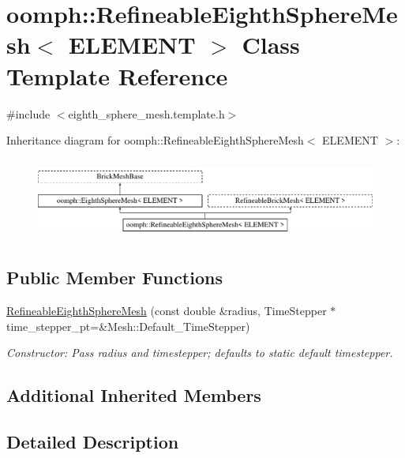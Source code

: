 \hypertarget{classoomph_1_1RefineableEighthSphereMesh}{}\section{oomph\+:\+:Refineable\+Eighth\+Sphere\+Mesh$<$ E\+L\+E\+M\+E\+NT $>$ Class Template Reference}
\label{classoomph_1_1RefineableEighthSphereMesh}


{\ttfamily \#include $<$eighth\+\_\+sphere\+\_\+mesh.\+template.\+h$>$}

Inheritance diagram for oomph\+:\+:Refineable\+Eighth\+Sphere\+Mesh$<$ E\+L\+E\+M\+E\+NT $>$\+:\begin{figure}[H]
\begin{center}
\leavevmode
\includegraphics[height=2.692308cm]{classoomph_1_1RefineableEighthSphereMesh}
\end{center}
\end{figure}
\subsection*{Public Member Functions}
\begin{DoxyCompactItemize}
\item 
\hyperlink{classoomph_1_1RefineableEighthSphereMesh_a975d12a45de7356f50bd69f3197659aa}{Refineable\+Eighth\+Sphere\+Mesh} (const double \&radius, Time\+Stepper $\ast$time\+\_\+stepper\+\_\+pt=\&Mesh\+::\+Default\+\_\+\+Time\+Stepper)
\begin{DoxyCompactList}\small\item\em Constructor\+: Pass radius and timestepper; defaults to static default timestepper. \end{DoxyCompactList}\end{DoxyCompactItemize}
\subsection*{Additional Inherited Members}


\subsection{Detailed Description}
